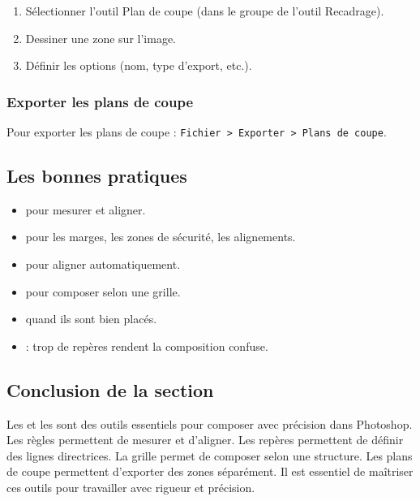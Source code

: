 \begin{enumerate}
    \item Sélectionner l'outil Plan de coupe (dans le groupe de l'outil Recadrage).
    \item Dessiner une zone sur l'image.
    \item Définir les options (nom, type d'export, etc.).
\end{enumerate}

\subsubsection{Exporter les plans de coupe}

Pour exporter les plans de coupe : \texttt{Fichier > Exporter > Plans de coupe}.

\subsection{Les bonnes pratiques}

\begin{itemize}
    \item {} pour mesurer et aligner.
    \item {} pour les marges, les zones de sécurité, les alignements.
    \item {} pour aligner automatiquement.
    \item {} pour composer selon une grille.
    \item {} quand ils sont bien placés.
    \item {} : trop de repères rendent la composition confuse.
\end{itemize}

\subsection*{Conclusion de la section}

Les  et les  sont des outils essentiels pour composer avec précision dans Photoshop. Les règles permettent de mesurer et d'aligner. Les repères permettent de définir des lignes directrices. La grille permet de composer selon une structure. Les plans de coupe permettent d'exporter des zones séparément. Il est essentiel de maîtriser ces outils pour travailler avec rigueur et précision.

